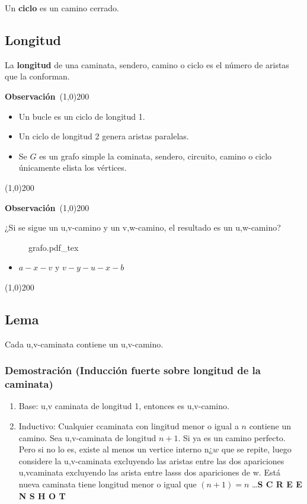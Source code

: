 \documentclass[a4paper]{book}
\newcommand{\incfig}[2][1]{%
    \def\svgwidth{#1\columnwidth}
    {#2.pdf_tex}
}
\newenvironment{obs}
    {
        \begin{flushleft}
       \textbf{Observación}\
        \line(1,0){200} \
        \end{flushleft}
    }
    {
        \begin{flushright}
        \line(1,0){200}
        \end{flushright}
    }
\begin{document}
Un \textbf{ciclo} es un camino cerrado.

\subsection{Longitud}
\label{ssec:longitud}

La \textbf{longitud} de una caminata, sendero, camino o ciclo es el número de aristas
que la conforman.

\begin{obs}
    \begin{itemize}
        \item Un bucle es un ciclo de longitud 1.
        \item Un ciclo de longitud 2 genera aristas paralelas.
        \item Se \(G\) es un grafo simple la cominata, sendero, circuito,
            camino o ciclo únicamente elista los vértices.
    \end{itemize}
\end{obs}

\begin{obs}
    ¿Si se sigue un u,v-camino y un v,w-camino, el resultado es un u,w-camino?
\begin{figure}[ht]
    \centering
    \incfig[0.5]{grafo}
\end{figure}
\begin{itemize}
    \item \(a-x-v\) y \(v-y-u-x-b\)
\end{itemize}
\end{obs}

\subsection{Lema}

Cada u,v-caminata contiene un u,v-camino.

\subsubsection{Demostración (Inducción fuerte sobre longitud de la caminata)}
\label{ssec:demostracion_induccion_fuerte_sobre_longitud_de_la_caminata_}

\begin{enumerate}[{P}]
    \item Base: u,v caminata de longitud 1, entonces es u,v-camino.
    \item Inductivo: Cualquier ccaminata con lingitud menor o igual a \(n\) contiene un camino. Sea u,v-caminata de longitud \(n+1\). Si ya es un camino perfecto. Pero si no lo es, existe al menos un vertice interno n¿\(w\) que se repite, luego considere la u,v-caminata excluyendo las aristas entre las dos apariciones u,vcaminata excluyendo las arista entre lasss dos apariciones de w. Está nueva caminata tiene longitud menor o igual que \(\left(n+1\right)=n\) \ldots \textbf{S C R E E N S H O T}
\end{enumerate}
\end{document}
